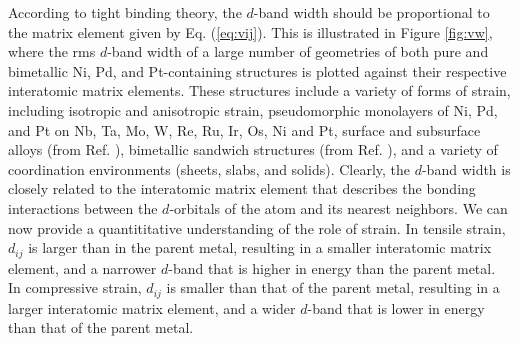 \documentclass[aps,prl,twocolumn,superscriptaddress,showkeys]{revtex4}
\begin{document}
According to tight binding theory, the $d$-band width should be
proportional to the matrix element given by Eq. (\ref{eq:vij}).  This
is illustrated in Figure \ref{fig:vw}, where the rms $d$-band width of a
large number of geometries of both pure and bimetallic Ni, Pd, and
Pt-containing structures is plotted against their respective
interatomic matrix elements. These structures include a variety of
forms of strain, including isotropic and anisotropic strain,
pseudomorphic monolayers of Ni, Pd, and Pt on Nb, Ta, Mo, W, Re, Ru,
Ir, Os, Ni and Pt, surface and subsurface alloys (from Ref.
\cite{kitchin2003:_elucid_ni_pt}), bimetallic sandwich structures
(from Ref. \cite{kitchin2004:_modif_surfac_elect_chemic_proper}), and
a variety of coordination environments (sheets, slabs, and solids).
Clearly, the $d$-band width is closely related to the interatomic matrix
element that describes the bonding interactions between the $d$-orbitals
of the atom and its nearest neighbors. We can now provide a
quantititative understanding of the role of strain. In tensile strain,
$d_{ij}$ is larger than in the parent metal, resulting in a smaller
interatomic matrix element, and a narrower $d$-band that is higher in
energy than the parent metal. In compressive strain, $d_{ij}$ is
smaller than that of the parent metal, resulting in a larger
interatomic matrix element, and a wider $d$-band that is lower in energy
than that of the parent metal.
 
\end{document}
